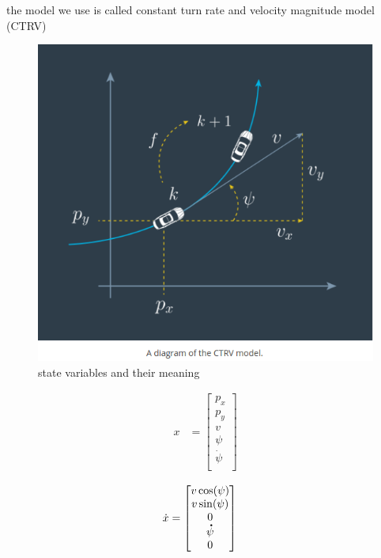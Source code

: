 \documentclass[a4paper,12pt]{article}
\newcommand*{\dt}[1]{%
  \accentset{\mbox{\large\bfseries .}}{#1}}
\begin{document}
the model we use is called constant turn rate and velocity magnitude model (CTRV)
\begin{figure}[h!]
  \caption{state variables and their meaning}
  \centering
    \includegraphics[scale=.5]{1.png}
\end{figure}

  \begin{align}
    x &= \begin{bmatrix}
         p_{x} \\
         p_{y} \\ 
         v \\
         \psi \\
         \dot{\psi} \\
         \end{bmatrix}
  \end{align}
  
  
  \begin{align}
    \dot{x} &= \begin{bmatrix}
         v\cos(\psi) \\
         v\sin(\psi) \\
         0 \\
         \dt{\psi} \\
         0 \\
         \end{bmatrix}
  \end{align}
\end{document}
